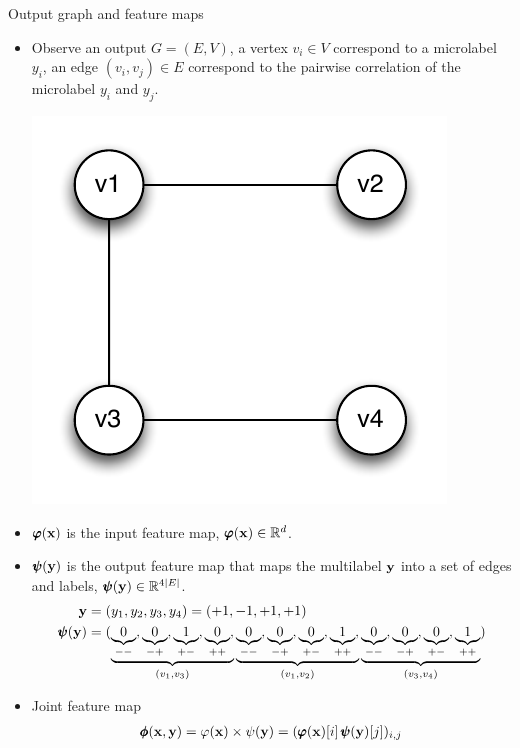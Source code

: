 \documentclass[first=dgreen,second=purple,logo=yellowexc]{aaltoslides}
\begin{document}
{\begin{frame}[allowframebreaks]{Output graph and feature maps}
	\begin{itemize}
		\item Observe an output $G=(E,V)$, a vertex $v_i\in V$ correspond to a microlabel $y_i$, an edge $(v_i,v_j)\in E$ correspond to the pairwise correlation of the microlabel $y_i$ and $y_j$.
		\begin{center}
			\includegraphics[scale=0.3]{./figures/outputgraph.pdf}
		\end{center}
		\item $\pmb \varphi(\mathbf {x})$ is the  input feature map, $\pmb \varphi(\mathbf {x})\in\mathbb{R}^d$.
		\item $\pmb \psi(\mathbf {y})$ is the output feature map that maps the multilabel $\mathbf {y}$ into a set of edges and labels, $\pmb \psi(\mathbf {y})\in\mathbb{R}^{4|E|}$.
		\begin{align*}
			\mathbf {y}&=(y_1,y_2,y_3,y_4)=(+1,-1,+1,+1)\\
			\pmb \psi(\mathbf {y}) &= ( \underbrace{\underbrace{0}_{--}, \underbrace{0}_{-+}, \underbrace{1}_{+-}, \underbrace{0}_{++},}_{(v_1,v_3)} 
			\underbrace{\underbrace{0}_{--}, \underbrace{0}_{-+}, \underbrace{0}_{+-}, \underbrace{1}_{++},}_{(v_1,v_2)}
			\underbrace{\underbrace{0}_{--}, \underbrace{0}_{-+}, \underbrace{0}_{+-}, \underbrace{1}_{++}}_{(v_3,v_4)})
		\end{align*}
		\framebreak
		\item Joint feature map
		\begin{align*}
			\pmb \phi(\mathbf {x},\mathbf {y}) = \varphi(\mathbf {x})\times\psi(\mathbf {y}) = (\pmb \varphi(\mathbf {x})[i]\,\pmb \psi(\mathbf {y})[j])_{i,j}
		\end{align*} 

\end{itemize}
\end{frame}}
\end{document}
